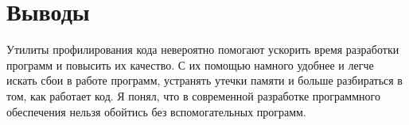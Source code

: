 \section{Выводы}

Утилиты профилирования кода невероятно помогают ускорить время разработки программ и повысить их качество. С их помощью намного  удобнее и легче искать сбои в работе программ, устранять утечки памяти и больше разбираться в том, как работает код.
Я понял, что в современной разработке программного обеспечения нельзя обойтись без вспомогательных программ.

\pagebreak